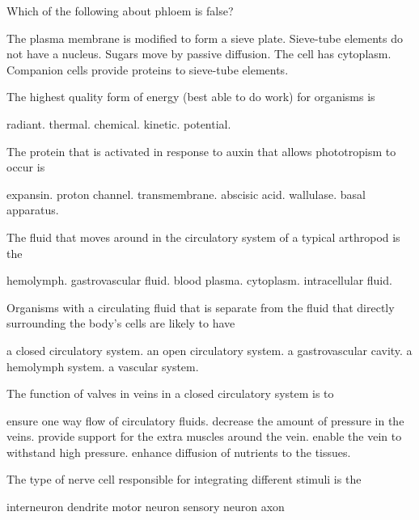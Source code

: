 \question
Which of the following about phloem is false?

\begin{choices}
\correctchoice The plasma membrane is modified to form a sieve plate. %
\choice Sieve-tube elements do not have a nucleus. %
\choice Sugars move by passive diffusion. %
\choice The cell has cytoplasm. %
\choice Companion cells provide proteins to sieve-tube elements. %
\end{choices}


\question
The highest quality form of energy (best able to do work) for organisms is

\begin{choices}
\correctchoice radiant. %
\choice thermal. %
\choice chemical. %
\choice kinetic. %
\choice potential. %
\end{choices}

\question
The protein that is activated in response to auxin that allows phototropism to occur is

\begin{choices}
\correctchoice expansin. %
\choice proton channel. %
\choice transmembrane. %
\choice abscisic acid. %
\choice wallulase. %
\choice basal apparatus. %
\end{choices}

\question
The fluid that moves around in the circulatory system of a typical arthropod is the

\begin{choices}
\correctchoice hemolymph. %
\choice gastrovascular fluid. %
\choice blood plasma. %
\choice cytoplasm. %
\choice intracellular fluid. %
\end{choices}

\question
Organisms with a circulating fluid that is separate from the fluid that directly surrounding the body's cells are likely to have

\begin{choices}
\correctchoice a closed circulatory system. %
\choice an open circulatory system. %
\choice a gastrovascular cavity. %
\choice a hemolymph system. %
\choice a vascular system. %
\end{choices}

\question
The function of valves in veins in a closed circulatory system is to 
\begin{choices}
\correctchoice ensure one way flow of circulatory fluids. %
\choice decrease the amount of pressure in the veins.  %
\choice provide support for the extra muscles around the vein. %
\choice enable the vein to withstand high pressure. %
\choice enhance diffusion of nutrients to the tissues. %
\end{choices}

\question
The type of nerve cell responsible for integrating different stimuli is the 

\begin{choices}
\correctchoice interneuron %
\choice dendrite %
\choice motor neuron %
\choice sensory neuron %
\choice axon %
\end{choices}

